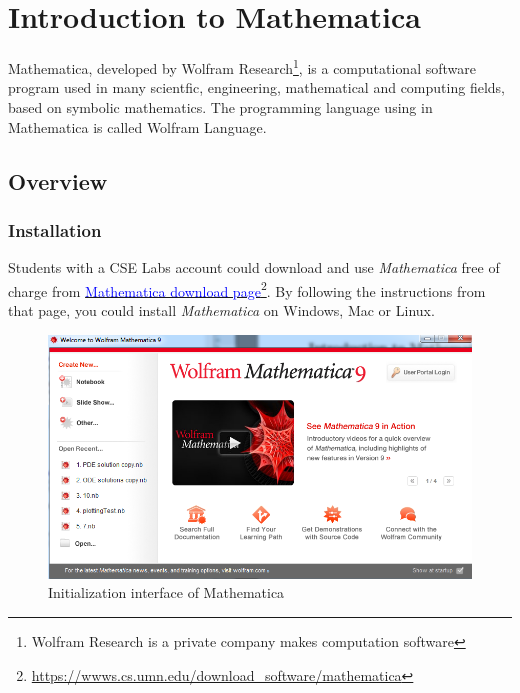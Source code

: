 
\chapter{Introduction to Mathematica}
Mathematica, developed by Wolfram Research\footnote{Wolfram Research is a private company makes computation software}, is a computational software program used in many scientfic, engineering, mathematical and computing fields, based on symbolic mathematics. The programming language using in Mathematica is called Wolfram Language.

\section{Overview}
\subsection{Installation}
Students with a CSE Labs account could download and use \emph{Mathematica} free of charge from \href{https://wwws.cs.umn.edu/download_software/mathematica}{\textcolor{blue} {Mathematica download page}}\footnote{\url{https://wwws.cs.umn.edu/download_software/mathematica}}. By following the instructions from that page, you could install \emph{Mathematica} on Windows, Mac or Linux. 

\begin{figure}[h!]
  \centering
    \includegraphics[scale=0.4]{figures/mathematica}
  \caption{Initialization interface of Mathematica}
  \label{fig:mathematica}
\end{figure}

